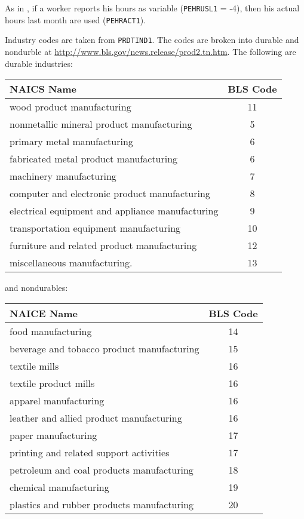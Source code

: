 \documentclass[11pt]{article}
\begin{document}
As in \cite{haefke_sonntag_vanRens_2013}, if a worker reports his hours as variable (\texttt{PEHRUSL1} = -4), then his actual hours last month are used (\texttt{PEHRACT1}).

Industry codes are taken from \texttt{PRDTIND1}.
The codes are broken into durable and nondurble at \href{http://www.bls.gov/news.release/prod2.tn.htm}{http://www.bls.gov/news.release/prod2.tn.htm}.
The following are durable industries:

\begin{center}
\begin{tabular}{lc} \toprule
NAICS Name                                      & BLS Code \\ \midrule
wood product manufacturing                      & 11       \\
nonmetallic mineral product manufacturing       & 5        \\
primary metal manufacturing                     & 6        \\
fabricated metal product manufacturing          & 6        \\
machinery manufacturing                         & 7        \\
computer and electronic product manufacturing   & 8        \\
electrical equipment and appliance manufacturing& 9        \\
transportation equipment manufacturing          & 10       \\
furniture and related product manufacturing     & 12       \\
miscellaneous manufacturing.                    & 13       \\
\end{tabular}
\end{center}
and nondurables:

\begin{center}
\begin{tabular}{lc} \toprule
NAICE Name                                  & BLS Code \\ \midrule
food manufacturing                          &  14      \\
beverage and tobacco product manufacturing  &  15      \\
textile mills                               &  16      \\
textile product mills                       &  16      \\
apparel manufacturing                       &  16      \\
leather and allied product manufacturing    &  16      \\
paper manufacturing                         &  17      \\
printing and related support activities     &  17      \\
petroleum and coal products manufacturing   &  18      \\
chemical manufacturing                      &  19      \\
plastics and rubber products manufacturing  &  20      \\
\end{tabular}
\end{center}
\end{document}
